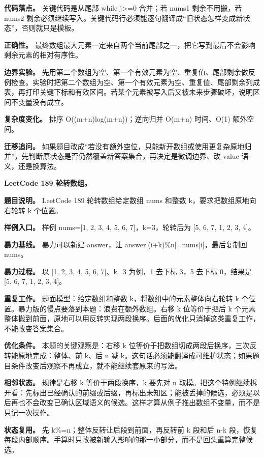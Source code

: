 \textbf{代码落点。} 关键代码是从尾部 while j>=0 合并；若 nums1 剩余不用搬，若 nums2 剩余必须继续写入。关键代码行必须能逐句翻译成“旧状态怎样变成新状态”，否则就只是模板。

\textbf{正确性。} 最终数组最大元素一定来自两个当前尾部之一，把它写到最后不会影响剩余元素的相对有序性。

\textbf{边界实验。} 先用第二个数组为空、第一个有效元素为空、重复值、尾部剩余做反例检查。实验时把第二个数组为空、第一个有效元素为空、重复值、尾部剩余列成表，再打印关键下标和有效区间。若某个元素被写入后又被未来步骤破坏，说明区间不变量没有成立。

\textbf{复杂度变化。} 排序 O((m+n)log(m+n))；逆向归并 O(m+n) 时间、O(1) 额外空间。

\textbf{迁移追问。} 如果题目改成“若没有额外空位，只能新开数组或使用更复杂原地归并”，先判断原状态是否仍然覆盖新答案集合，再决定是微调边界、改 value 语义，还是换算法。

\noindent\textbf{LeetCode 189 轮转数组。}

\textbf{题目说明。} LeetCode 189 轮转数组给定数组 nums 和整数 k，要求把数组原地向右轮转 k 个位置。

\textbf{样例入口。} 样例 nums=[1, 2, 3, 4, 5, 6, 7]，k=3，轮转后为 [5, 6, 7, 1, 2, 3, 4]。

\textbf{暴力基线。} 暴力可以新建 answer，让 answer[(i+k)\%n]=nums[i]，最后复制回 nums。

\textbf{暴力过程。} 以 [1, 2, 3, 4, 5, 6, 7]、k=3 为例，1 去下标 3，5 去下标 0，结果是 [5, 6, 7, 1, 2, 3, 4]。

\textbf{重复工作。} 题面模型：给定数组和整数 k，将数组中的元素整体向右轮转 k 个位置。暴力版的慢点要落到本题：浪费在额外数组。右移 k 位等价于把后 k 个元素整体搬到前面，原地可以用反转实现两段换序。后面的优化只消掉这类重复工作，不能改变答案集合。

\textbf{优化条件。} 本题的关键观察是：右移 k 位等价于把数组切成两段后换序，三次反转能原地完成：整体、前 k、后 n 减 k。这句话必须能翻译成可维护状态；如果题目条件改变后观察不再成立，就不能继续套原来的写法。

\textbf{相邻状态。} 规律是右移 k 等价于两段换序，k 要先对 n 取模。把这个特例继续拆开看：先标出已经确认的前缀或后缀，再标出未知区；能被丢掉的候选，必须是以后再也不会改变已确认区域语义的候选。这样才算从例子推出数组不变量，而不是只记一次操作。

\textbf{状态复用。} 先 k\%=n；整体反转让后段到前面，再反转前 k 段和后 n-k 段，恢复每段内部顺序。手算时只改被新输入影响的那一小部分，而不是回头重算完整候选。

